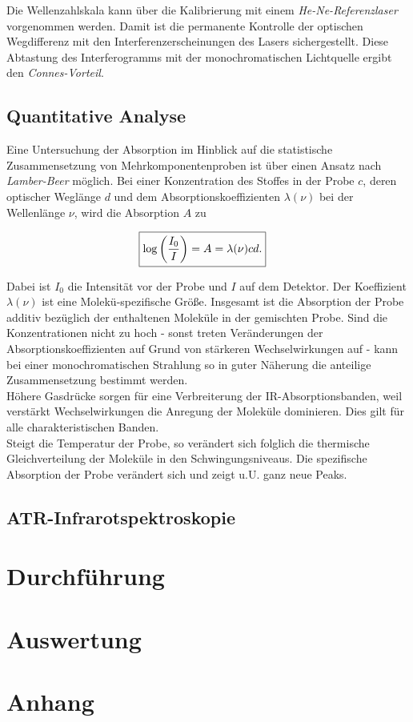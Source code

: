 \documentclass[a4paper,10pt,twocolumn]{article}
\newcommand{\ix}[1]{_\text{#1}}
\newcommand{\tilt}[1]{\textit{#1}}
\begin{document}
		Die Wellenzahlskala kann \"uber die Kalibrierung mit einem \tilt{He-Ne-Referenzlaser} vorgenommen werden. Damit ist die permanente Kontrolle der optischen Wegdifferenz mit den Interferenzerscheinungen des Lasers sichergestellt. Diese Abtastung des Interferogramms mit der monochromatischen Lichtquelle ergibt den \tilt{Connes-Vorteil}.
		
		\subsection{Quantitative Analyse}
		
		Eine Untersuchung der Absorption im Hinblick auf die statistische Zusammensetzung von Mehrkomponentenproben ist \"uber einen Ansatz nach \tilt{Lamber-Beer} m\"oglich. Bei einer Konzentration des Stoffes in der Probe $c$, deren optischer Wegl\"ange $d$ und dem Absorptionskoeffizienten $\lambda(\nu)$ bei der Wellenl\"ange $\nu$, wird die Absorption $A$ zu
		
		\begin{align}
		\Aboxed{
			\log\left(\frac{I\ix{0}}{I}\right)=A=\lambda(\nu)cd .
		}
		\label{eq:lamber}
		\end{align}
		
		
		Dabei ist $I\ix{0}$ die Intensit\"at vor der Probe und $I$ auf dem Detektor. Der Koeffizient $\lambda(\nu)$ ist eine Molek\"u-spezifische Gr\"o{\ss}e. Insgesamt ist die Absorption der Probe additiv bez\"uglich der enthaltenen Molek\"ule in der gemischten Probe. Sind die Konzentrationen nicht zu hoch - sonst treten Ver\"anderungen der Absorptionskoeffizienten auf Grund von st\"arkeren Wechselwirkungen auf - kann bei einer monochromatischen Strahlung so in guter N\"aherung die anteilige Zusammensetzung bestimmt werden.\\
		H\"ohere Gasdr\"ucke sorgen f\"ur eine Verbreiterung der IR-Absorptionsbanden, weil verst\"arkt Wechselwirkungen die Anregung der Molek\"ule dominieren. Dies gilt f\"ur alle charakteristischen Banden.\\
		Steigt die Temperatur der Probe, so ver\"andert sich folglich die thermische Gleichverteilung der Molek\"ule in den Schwingungsniveaus. Die spezifische Absorption der Probe ver\"andert sich und zeigt u.U. ganz neue Peaks. 
		
	\subsection{ATR-Infrarotspektroskopie}
		
		
		
	\section{Durchführung}

		
	\section{Auswertung}

	
	\section{Anhang}

		
		
\end{document}
